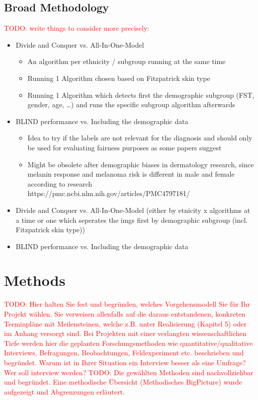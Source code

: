 \documentclass[12pt, a4paper, oneside]{book}   	%
\renewcommand{\todo}[1]{\textcolor{red}{TODO: #1}}
\begin{document}
		\section{Broad Methodology}
			\todo{write things to consider more precisely:}
			\begin{itemize}
				\item Divide and Conquer vs. All-In-One-Model
				\begin{itemize}
					 \item An algorithm per ethnicity / subgroup running at the same time
					\item Running 1 Algorithm chosen based on Fitzpatrick skin type
					\item Running 1 Algorithm which detects first the demographic subgroup (FST, gender, age, …) and runs the specific subgroup algorithm afterwards
				\end{itemize}
			\item BLIND performance vs. Including the demographic data
				\begin{itemize}
					\item Idea to try if the labels are not relevant for the diagnosis and should only be used for evaluating fairness purposes as some papers suggest 
					\item Might be obsolete after demographic biases in dermatology research, since melanin response and melanoma risk is different in male and female according to research https://pmc.ncbi.nlm.nih.gov/articles/PMC4797181/
				\end{itemize}
			\end{itemize}
			\begin{itemize}
				\item Divide and Conquer vs. All-In-One-Model (either by etnicity x algorithms at a time or one which seperates the imgs first by demographic subgroup (incl. Fitzpatrick skin type))
				\item BLIND performance vs. Including the demographic data
			\end{itemize}

	\chapter{Methods}
		\todo{Hier halten Sie fest und begründen, welches Vorgehensmodell Sie für Ihr Projekt wählen. Sie verweisen allenfalls auf die daraus entstandenen, konkreten Terminpläne mit Meilensteinen, welche z.B. unter Realisierung (Kapitel 5) oder im Anhang versorgt sind. Bei Projekten mit einer verlangten wissenschaftlichen Tiefe werden hier die geplanten Forschungsmethoden wie quantitative/qualitative Interviews, Befragungen, Beobachtungen, Feldexperiment etc. beschrieben und begründet. Warum ist in Ihrer Situation ein Interview besser als eine Umfrage? Wer soll interview werden?}
		\todo{Die gewählten Methoden sind nachvollziehbar und begründet. Eine methodische Übersicht (Methodisches BigPicture) wurde aufgezeigt und Abgrenzungen erläutert.}
\end{document}
